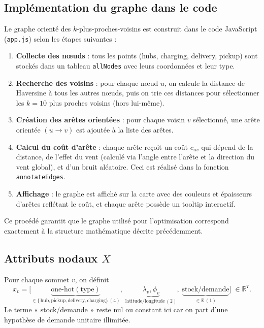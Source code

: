 \documentclass[11pt,a4paper]{article}
\newcommand{\R}{\mathbb{R}}
\begin{document}
\subsection*{Implémentation du graphe dans le code}
Le graphe orienté des \(k\)-plus-proches-voisins est construit dans le code JavaScript (\texttt{app.js}) selon les étapes suivantes :
\begin{enumerate}
  \item \textbf{Collecte des nœuds} : tous les points (hubs, charging, delivery, pickup) sont stockés dans un tableau \texttt{allNodes} avec leurs coordonnées et leur type.
  \item \textbf{Recherche des voisins} : pour chaque nœud \(u\), on calcule la distance de Haversine à tous les autres nœuds, puis on trie ces distances pour sélectionner les \(k=10\) plus proches voisins (hors lui-même).
  \item \textbf{Création des arêtes orientées} : pour chaque voisin \(v\) sélectionné, une arête orientée \((u \to v)\) est ajoutée à la liste des arêtes.
  \item \textbf{Calcul du coût d’arête} : chaque arête reçoit un coût $c_{uv}$ qui dépend de la distance, de l’effet du vent (calculé via l’angle entre l’arête et la direction du vent global), et d’un bruit aléatoire. Ceci est réalisé dans la fonction \texttt{annotateEdges}.
  \item \textbf{Affichage} : le graphe est affiché sur la carte avec des couleurs et épaisseurs d’arêtes reflétant le coût, et chaque arête possède un tooltip interactif.
\end{enumerate}
Ce procédé garantit que le graphe utilisé pour l’optimisation correspond exactement à la structure mathématique décrite précédemment.

\subsection{Attributs nodaux \texorpdfstring{\(X\)}{X}}
Pour chaque sommet \(v\), on définit
\[
  x_v = \bigl[
    \underbrace{\mathrm{one\mbox{-}hot}(\mathrm{type})}_{\in\{\,\text{hub},\text{pickup},\text{delivery},\text{charging}\}\, (4)},
    \;
    \underbrace{\lambda_v,\phi_v}_{\text{latitude/longitude}\,(2)},
    \;
    \underbrace{\text{stock/demande}}_{\in\R\, (1)}
  \bigr]\;\in\R^{7}.
\]
Le terme « stock/demande » reste nul ou constant ici car on part d'une hypothèse de demande unitaire illimitée.

\end{document}
